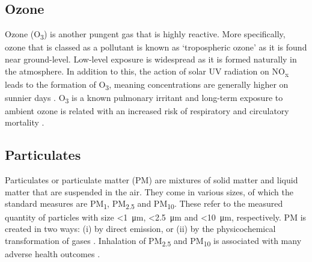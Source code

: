 \documentclass[11pt,twosided,a4paper]{report}
\begin{document}
%


\subsection{Ozone}

Ozone (O\textsubscript{3}) is another pungent gas that is highly reactive. More specifically, ozone that is classed as a pollutant is known as `tropospheric ozone' as it is found near ground-level. Low-level exposure is widespread as it is formed naturally in the atmosphere. In addition to this, the action of solar UV radiation on NO\textsubscript{x} leads to the formation of O\textsubscript{3}, meaning concentrations are generally higher on sunnier days \citep{Brook2004cardiostmnt}. O\textsubscript{3} is a known pulmonary irritant \citep{Ebi2008ozonePMhealth} and long-term exposure to ambient ozone is related with an increased risk of respiratory and circulatory mortality \citep{Turner2016ozonemortality}.

\subsection{Particulates}

Particulates or particulate matter (PM) are mixtures of solid matter and liquid matter that are suspended in the air. They come in various sizes, of which the standard measures are PM\textsubscript{1}, PM\textsubscript{2.5} and PM\textsubscript{10}. These refer to the measured quantity of particles with size \textless \SI{1}{\micro\metre}, \textless \SI{2.5}{\micro\metre} and \textless \SI{10}{\micro\metre}, respectively. PM is created in two ways: (i) by direct emission, or (ii) by the physicochemical transformation of gases \citep{Brook2004cardiostmnt}. Inhalation of PM\textsubscript{2.5} and PM\textsubscript{10} is associated with many adverse health outcomes \citep{pope1995particulate,pope2002lungcancercardiomortality,Anderson2012clearingtheair,Beelen2014escapeproject}.
\end{document}
